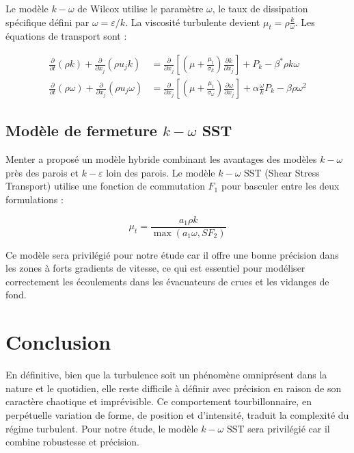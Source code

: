 Le modèle \( k-\omega \) de Wilcox \cite{wilcox1988reassessment} utilise le paramètre \( \omega \), le taux de dissipation spécifique défini par \( \omega = \varepsilon/k \). La viscosité turbulente devient \( \mu_t = \rho \frac{k}{\omega} \). Les équations de transport sont \cite{wilcox2008formulation} :

\begin{align}
\frac{\partial}{\partial t} (\rho k) + \frac{\partial}{\partial x_j} (\rho u_j k) &= \frac{\partial}{\partial x_j} \left[ \left( \mu + \frac{\mu_t}{\sigma_k} \right) \frac{\partial k}{\partial x_j} \right] + P_k - \beta^* \rho k \omega \label{eq:transport_k_omega} \\
\frac{\partial}{\partial t} (\rho \omega) + \frac{\partial}{\partial x_j} (\rho u_j \omega) &= \frac{\partial}{\partial x_j} \left[ \left( \mu + \frac{\mu_t}{\sigma_\omega} \right) \frac{\partial \omega}{\partial x_j} \right] + \alpha \frac{\omega}{k} P_k - \beta \rho \omega^2 \label{eq:transport_omega}
\end{align}

\subsection{Modèle de fermeture \( k-\omega \) SST}
\label{subsec:modele_k_omega_sst}

Menter \cite{menter1994two} a proposé un modèle hybride combinant les avantages des modèles \( k-\omega \) près des parois et \( k-\varepsilon \) loin des parois. Le modèle \( k-\omega \) SST (Shear Stress Transport) utilise une fonction de commutation \( F_1 \) pour basculer entre les deux formulations \cite{menter2003ten} :

\begin{equation}
\mu_t = \frac{a_1 \rho k}{\max(a_1 \omega, S F_2)}
\label{eq:mu_t_sst}
\end{equation}

Ce modèle sera privilégié pour notre étude car il offre une bonne précision dans les zones à forts gradients de vitesse, ce qui est essentiel pour modéliser correctement les écoulements dans les évacuateurs de crues et les vidanges de fond.

\section{Conclusion}
\label{sec:conclusion_chap2}

En définitive, bien que la turbulence soit un phénomène omniprésent dans la nature et le quotidien, elle reste difficile à définir avec précision en raison de son caractère chaotique et imprévisible. Ce comportement tourbillonnaire, en perpétuelle variation de forme, de position et d'intensité, traduit la complexité du régime turbulent. Pour notre étude, le modèle \( k-\omega \) SST sera privilégié car il combine robustesse et précision.